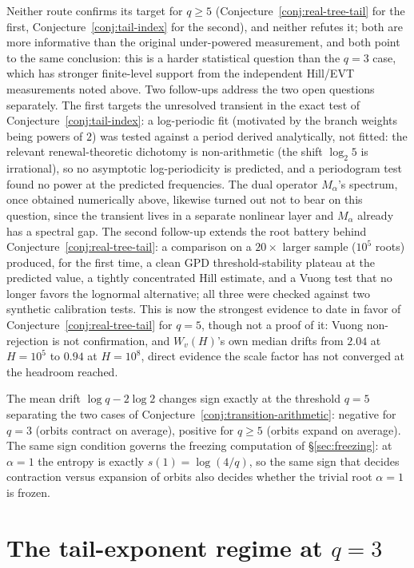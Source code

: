 \documentclass[11pt]{article}
\theoremstyle{remark}
\begin{document}
Neither route confirms its target for $q\ge5$
(Conjecture~\ref{conj:real-tree-tail} for the first,
Conjecture~\ref{conj:tail-index} for the second), and neither refutes
it; both are more informative than the original under-powered
measurement, and both point to the same conclusion: this is a harder
statistical question than the $q=3$ case, which has stronger
finite-level support from the independent Hill/EVT measurements noted
above. Two follow-ups address the two open questions separately. The
first targets the unresolved transient in the exact test of
Conjecture~\ref{conj:tail-index}: a log-periodic
fit (motivated by the branch weights being powers of $2$) was tested
against a period derived analytically, not fitted: the relevant
renewal-theoretic dichotomy is non-arithmetic (the shift $\log_2 5$ is
irrational), so no asymptotic log-periodicity is predicted, and a
periodogram test found no power at the predicted frequencies. The dual
operator $M_\alpha$'s spectrum, once obtained numerically above,
likewise turned out not to bear on this question, since the transient
lives in a separate nonlinear layer and $M_\alpha$ already has a
spectral gap. The second follow-up extends the root
battery behind Conjecture~\ref{conj:real-tree-tail}: a comparison on a
$20\times$ larger sample ($10^5$ roots)
produced, for the first time, a clean GPD threshold-stability plateau
at the predicted value, a tightly concentrated Hill estimate, and a
Vuong test that no longer favors the lognormal alternative; all three
were checked against two synthetic calibration tests. This is now the
strongest evidence to date in favor of
Conjecture~\ref{conj:real-tree-tail}
for $q=5$, though not a proof of it: Vuong non-rejection is not
confirmation, and $W_v(H)$'s own median drifts from $2.04$ at
$H=10^5$ to $0.94$ at $H=10^8$, direct evidence the scale factor has
not converged at the headroom reached.

The mean drift $\log q - 2\log 2$ changes sign exactly at the
threshold $q=5$ separating the two cases of
Conjecture~\ref{conj:transition-arithmetic}: negative for $q=3$ (orbits
contract on average), positive for $q\ge 5$ (orbits expand on average).
The same sign condition governs the freezing computation of
\S\ref{sec:freezing}: at $\alpha=1$ the entropy is exactly
$s(1)=\log(4/q)$, so the same sign that decides contraction versus
expansion of orbits also decides whether the trivial root $\alpha=1$
is frozen.

\section{The tail-exponent regime at \texorpdfstring{$q=3$}{q=3}}
\label{sec:tail-regime}
\end{document}
